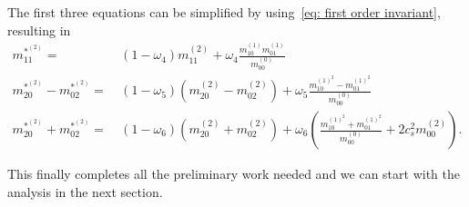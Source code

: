 The first three equations can be simplified by using~\eqref{eq: first order invariant}, resulting in
\begin{align}
  \label{eq: collide moments 11_2}
  m_{11}^{*^{(2)}}  =&\ (1-\omega_4)m_{11}^{(2)} + \omega_4 \frac{ m_{10}^{(1)}m_{01}^{(1)}}{m_{00}^{(0)}}
  \\
  \label{eq: collide moments 20m02_2}
  m_{20}^{*^{(2)}}-m_{02}^{*^{(2)}} =&\ (1-\omega_5) \left(m_{20}^{(2)}-m_{02}^{(2)}\right) + \omega_5 \frac{ m_{10}^{{(1)}^2} - m_{01}^{{(1)}^2}}{m_{00}^{(0)}}
  \\
  \label{eq: collide moments 20p02_2}
  m_{20}^{*^{(2)}}+m_{02}^{*^{(2)}}
  =&\ (1-\omega_6)\left(  m_{20}^{(2)} + m_{02}^{(2)}\right)
  + \omega_6 \left( \frac{ m_{10}^{{(1)}^2} + m_{01}^{{(1)}^2}}{m_{00}^{(0)}}
  + 2 c_s^2 m_{00}^{(2)} \right).
\end{align}


This finally completes all the preliminary work needed and we can start with the analysis in the next section.
